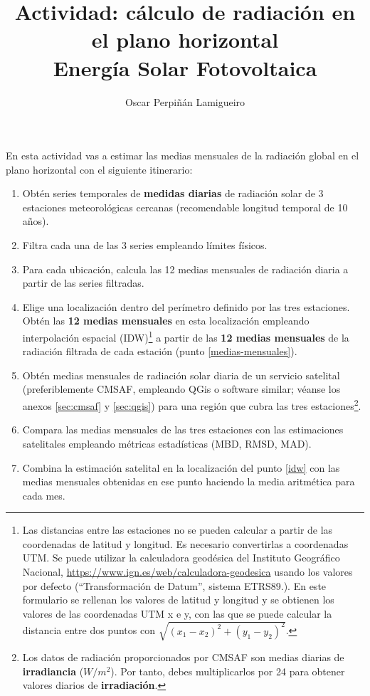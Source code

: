 \documentclass[11pt]{article}
\author{Oscar Perpiñán Lamigueiro}
\date{}
\title{Actividad: cálculo de radiación en el plano horizontal\\\medskip
\large Energía Solar Fotovoltaica}
\begin{document}
\maketitle

En esta actividad vas a estimar las medias mensuales de la radiación
global en el plano horizontal con el siguiente itinerario:

\begin{enumerate}
\item Obtén series temporales de \textbf{medidas diarias} de radiación
  solar de 3 estaciones meteorológicas cercanas (recomendable longitud
  temporal de 10 años).
\item Filtra cada una de las 3 series empleando límites físicos. \label{filtrado}
\item Para cada ubicación, calcula las 12 medias mensuales de
  radiación diaria a partir de las series filtradas. \label{medias-mensuales}
\item Elige una localización dentro del perímetro definido por las
  tres estaciones. Obtén las \textbf{12 medias mensuales} en esta
  localización empleando interpolación espacial (IDW)\footnote{Las
    distancias entre las estaciones no se pueden calcular a partir de
    las coordenadas de latitud y longitud. Es necesario convertirlas a
    coordenadas UTM. Se puede utilizar la calculadora geodésica del
    Instituto Geográfico Nacional,
    \url{https://www.ign.es/web/calculadora-geodesica} usando los
    valores por defecto (``Transformación de Datum'', sistema
    ETRS89.). En este formulario se rellenan los valores de latitud y
    longitud y se obtienen los valores de las coordenadas UTM x e y,
    con las que se puede calcular la distancia entre dos puntos con
    $\sqrt{(x_1 - x_2)^2 + (y_1 - y_2)^2}$.} a partir de las
  \textbf{12 medias mensuales} de la radiación filtrada de cada
  estación (punto \ref{medias-mensuales}). \label{idw}
\item Obtén medias mensuales de radiación solar diaria de un servicio
  satelital (preferiblemente CMSAF, empleando QGis o software similar;
  véanse los anexos \ref{sec:cmsaf} y \ref{sec:qgis}) para una región que
  cubra las tres estaciones\footnote{Los datos de radiación
    proporcionados por CMSAF son medias diarias de
    \textbf{irradiancia} (\(W/m^2\)). Por tanto, debes multiplicarlos
    por 24 para obtener valores diarios de
    \textbf{irradiación}.}.\label{satelite}
\item Compara las medias mensuales de las tres estaciones con las
  estimaciones satelitales empleando métricas estadísticas (MBD, RMSD,
  MAD).
\item Combina la estimación satelital en la localización del punto
  \ref{idw} con las medias mensuales obtenidas en ese punto haciendo
  la media aritmética para cada mes.
\end{enumerate}
\end{document}
